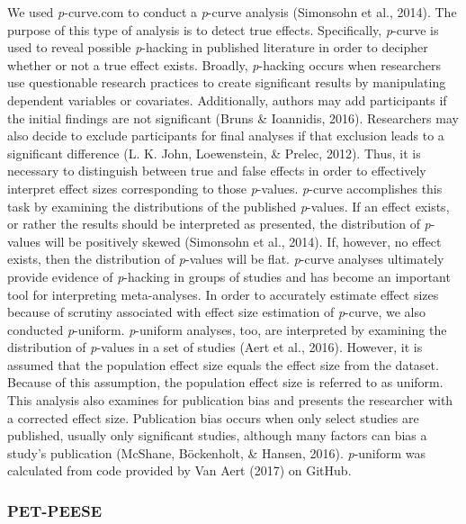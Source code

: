 \documentclass[english,man, mask]{apa6}
\newcounter{author}
\theoremstyle{definition}
\theoremstyle{definition}
\theoremstyle{definition}
\theoremstyle{remark}
\begin{document}
We used \emph{p}-curve.com to conduct a \emph{p}-curve analysis
(Simonsohn et al., 2014). The purpose of this type of analysis is to
detect true effects. Specifically, \emph{p}-curve is used to reveal
possible \emph{p}-hacking in published literature in order to decipher
whether or not a true effect exists. Broadly, \emph{p}-hacking occurs
when researchers use questionable research practices to create
significant results by manipulating dependent variables or covariates.
Additionally, authors may add participants if the initial findings are
not significant (Bruns \& Ioannidis, 2016). Researchers may also decide
to exclude participants for final analyses if that exclusion leads to a
significant difference (L. K. John, Loewenstein, \& Prelec, 2012). Thus,
it is necessary to distinguish between true and false effects in order
to effectively interpret effect sizes corresponding to those
\emph{p}-values. \emph{p}-curve accomplishes this task by examining the
distributions of the published \emph{p}-values. If an effect exists, or
rather the results should be interpreted as presented, the distribution
of \emph{p}-values will be positively skewed (Simonsohn et al., 2014).
If, however, no effect exists, then the distribution of \emph{p}-values
will be flat. \emph{p}-curve analyses ultimately provide evidence of
\emph{p}-hacking in groups of studies and has become an important tool
for interpreting meta-analyses. In order to accurately estimate effect
sizes because of scrutiny associated with effect size estimation of
\emph{p}-curve, we also conducted \emph{p}-uniform. \emph{p}-uniform
analyses, too, are interpreted by examining the distribution of
\emph{p}-values in a set of studies (Aert et al., 2016). However, it is
assumed that the population effect size equals the effect size from the
dataset. Because of this assumption, the population effect size is
referred to as uniform. This analysis also examines for publication bias
and presents the researcher with a corrected effect size. Publication
bias occurs when only select studies are published, usually only
significant studies, although many factors can bias a study's
publication (McShane, Böckenholt, \& Hansen, 2016). \emph{p}-uniform was
calculated from code provided by Van Aert (2017) on GitHub.

\subsubsection{PET-PEESE}\label{pet-peese}
\end{document}
